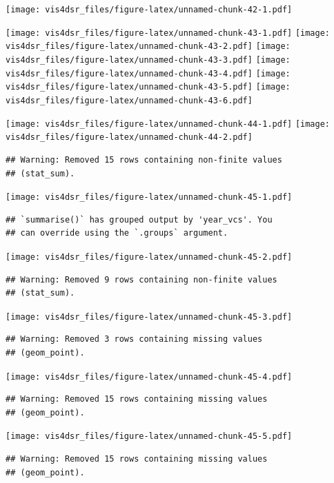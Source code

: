 \documentclass[
]{krantz}
\begin{document}
\texttt{[image: vis4dsr\_files/figure-latex/unnamed-chunk-42-1.pdf]}

\texttt{[image: vis4dsr\_files/figure-latex/unnamed-chunk-43-1.pdf]} \texttt{[image: vis4dsr\_files/figure-latex/unnamed-chunk-43-2.pdf]} \texttt{[image: vis4dsr\_files/figure-latex/unnamed-chunk-43-3.pdf]} \texttt{[image: vis4dsr\_files/figure-latex/unnamed-chunk-43-4.pdf]} \texttt{[image: vis4dsr\_files/figure-latex/unnamed-chunk-43-5.pdf]} \texttt{[image: vis4dsr\_files/figure-latex/unnamed-chunk-43-6.pdf]}

\texttt{[image: vis4dsr\_files/figure-latex/unnamed-chunk-44-1.pdf]} \texttt{[image: vis4dsr\_files/figure-latex/unnamed-chunk-44-2.pdf]}

\begin{verbatim}
## Warning: Removed 15 rows containing non-finite values
## (stat_sum).
\end{verbatim}

\texttt{[image: vis4dsr\_files/figure-latex/unnamed-chunk-45-1.pdf]}

\begin{verbatim}
## `summarise()` has grouped output by 'year_vcs'. You
## can override using the `.groups` argument.
\end{verbatim}

\texttt{[image: vis4dsr\_files/figure-latex/unnamed-chunk-45-2.pdf]}

\begin{verbatim}
## Warning: Removed 9 rows containing non-finite values
## (stat_sum).
\end{verbatim}

\texttt{[image: vis4dsr\_files/figure-latex/unnamed-chunk-45-3.pdf]}

\begin{verbatim}
## Warning: Removed 3 rows containing missing values
## (geom_point).
\end{verbatim}

\texttt{[image: vis4dsr\_files/figure-latex/unnamed-chunk-45-4.pdf]}

\begin{verbatim}
## Warning: Removed 15 rows containing missing values
## (geom_point).
\end{verbatim}

\texttt{[image: vis4dsr\_files/figure-latex/unnamed-chunk-45-5.pdf]}

\begin{verbatim}
## Warning: Removed 15 rows containing missing values
## (geom_point).
\end{verbatim}
\end{document}
